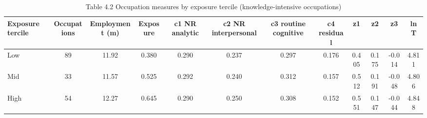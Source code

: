\begin{table}[htbp]\centering
\caption{Table 4.2 Occupation measures by exposure tercile (knowledge-intensive occupations)}
\begin{tabular}{lccccccccccc}
\toprule
Exposure tercile & Occupations & Employment (m) & Exposure & c1 NR analytic & c2 NR interpersonal & c3 routine cognitive & c4 residual & z1 & z2 & z3 & ln T \\
\midrule
Low & 89 & 11.92 & 0.380 & 0.290 & 0.237 & 0.297 & 0.176 & 0.405 & 0.175 & -0.014 & 4.811 \\
Mid & 33 & 11.57 & 0.525 & 0.292 & 0.240 & 0.312 & 0.157 & 0.512 & 0.191 & -0.048 & 4.806 \\
High & 54 & 12.27 & 0.645 & 0.290 & 0.250 & 0.308 & 0.152 & 0.551 & 0.147 & -0.044 & 4.848 \\
\bottomrule
\end{tabular}
\par\vspace{2pt}{\footnotesize Means weighted by OEWS employment. Terciles are employment-weighted thirds of the knowledge-intensive occupations (step 03).}
\end{table}
